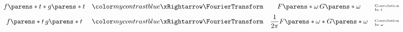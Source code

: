 \begin{multicols}{2}
\begin{CheatsheetEntryFrame}
\begin{equation*}
\begin{array}{cccl}
                f\parens*{t} * g\parens*{t}
                &\TmpFTArrow&
                F\parens*{\omega} \, G\parens*{\omega}
                & \text{\tiny\parbox{6em}{Convolution\\In $t$}}
                \\[0.6em]
                {\displaystyle f\parens*{t} \, g\parens*{t}}
                &\TmpFTArrow&
                {\displaystyle
                    \frac{1}{2 \pi} F\parens*{\omega} * G\parens*{\omega}
                }
                & \text{\tiny\parbox{6em}{Convolution\\In $\omega$}}
            \end{array}
        \end{equation*}

    \end{CheatsheetEntryFrame}

    \begin{CheatsheetEntryFrame}


\end{CheatsheetEntryFrame}
\end{multicols}
